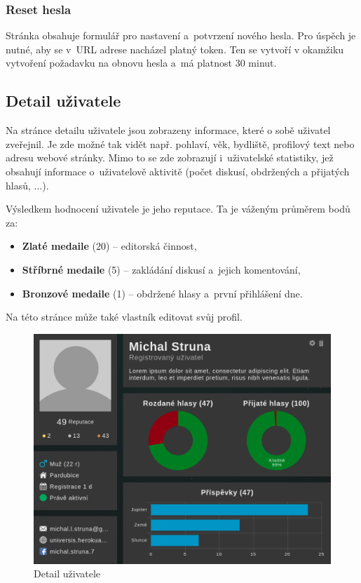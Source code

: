 \documentclass[a4paper,12pt]{article}
\begin{document}
\subsubsection{Reset hesla}

Stránka obsahuje formulář pro nastavení a~potvrzení nového hesla. Pro úspěch je nutné, aby se v~URL adrese nacházel platný token. Ten se vytvoří v okamžiku vytvoření požadavku na obnovu hesla a~má platnost 30 minut.

\subsection{Detail uživatele}

Na stránce detailu uživatele jsou zobrazeny informace, které o sobě uživatel zveřejnil. Je zde možné tak vidět např. pohlaví, věk, bydliště, profilový text nebo adresu webové stránky. Mimo to se zde zobrazují i~uživatelské statistiky, jež obsahují informace o~uživatelově aktivitě (počet diskusí, obdržených a přijatých hlasů, ...).

Výsledkem hodnocení uživatele je jeho reputace. Ta je váženým průměrem bodů za:

\begin{itemize}
\item \textbf{Zlaté medaile} (20) -- editorská činnost,
\item \textbf{Stříbrné medaile} (5) -- zakládání diskusí a~jejich komentování,
\item \textbf{Bronzové medaile} (1) -- obdržené hlasy a~první přihlášení dne.
\end{itemize}

Na této stránce může také vlastník editovat svůj profil.

\begin{figure}[H]
\begin{center}
\includegraphics[width=450pt]{Images/UserDetail.png}
\caption{Detail uživatele}
\end{center}
\end{figure}
\end{document}
